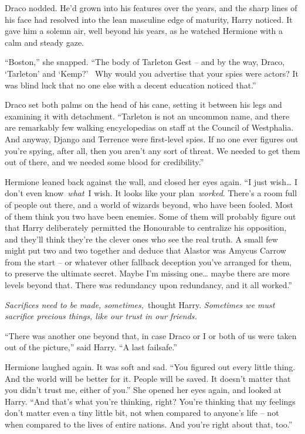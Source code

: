 Draco nodded. He'd grown into his features over the years, and the sharp
lines of his face had resolved into the lean masculine edge of maturity,
Harry noticed. It gave him a solemn air, well beyond his years, as he
watched Hermione with a calm and steady gaze.

``Boston,'' she snapped. ``The body of Tarleton Gest -- and by the way,
Draco, `Tarleton' and `Kemp?' ~Why would you advertise that your spies
were actors? It was blind luck that no one else with a decent education
noticed that.''

Draco set both palms on the head of his cane, setting it between his
legs and examining it with detachment. ``Tarleton is not an uncommon
name, and there are remarkably few walking encyclopedias on staff at the
Council of Westphalia. And anyway, Django and Terrence were first-level
spies. If no one ever figures out you're spying, after all, then you
aren't any sort of threat. We needed to get them out of there, and we
needed some blood for credibility.''

Hermione leaned back against the wall, and closed her eyes again. ``I
just wish\ldots{} I don't even know~\emph{what}~I wish. It looks like
your plan~\emph{worked}. There's a room full of people out there, and a
world of wizards beyond, who have been fooled. Most of them think you
two have been enemies. Some of them will probably figure out that Harry
deliberately permitted the Honourable to centralize his opposition, and
they'll think they're the clever ones who see the real truth. A small
few might put two and two together and deduce that Alastor was Amycus
Carrow from the start -- or whatever other fallback deception you've
arranged for them, to preserve the ultimate secret. Maybe I'm missing
one\ldots{} maybe there are more levels beyond that. There was
redundancy upon redundancy, and it all worked.''

\emph{Sacrifices need to be made, sometimes,}~thought Harry.
\emph{Sometimes we must sacrifice precious things, like our trust in our
friends.}

``There was another one beyond that, in case Draco or I or both of us
were taken out of the picture,'' said Harry. ``A last failsafe.''

Hermione laughed again. It was soft and sad. ``You figured out every
little thing. And the world will be better for it. People will be saved.
It doesn't matter that you didn't trust me, either of you.'' She opened
her eyes again, and looked at Harry. ``And that's what you're thinking,
right? You're thinking that my feelings don't matter even a tiny little
bit, not when compared to anyone's life -- not when compared to the
lives of entire nations. And you're right about that, too.''


